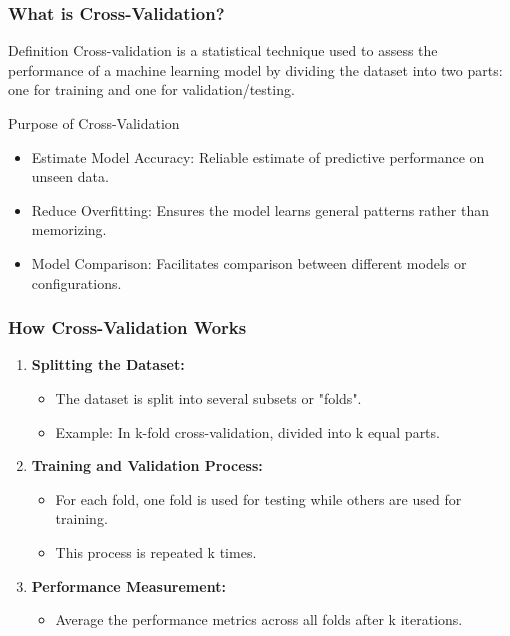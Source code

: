 \documentclass[aspectratio=169]{beamer}
\begin{document}
\begin{frame}[fragile]
    \frametitle{What is Cross-Validation?}
    \begin{block}{Definition}
        Cross-validation is a statistical technique used to assess the performance of a machine learning model by dividing the dataset into two parts: one for training and one for validation/testing.
    \end{block}
    
    \begin{block}{Purpose of Cross-Validation}
        \begin{itemize}
            \item Estimate Model Accuracy: Reliable estimate of predictive performance on unseen data.
            \item Reduce Overfitting: Ensures the model learns general patterns rather than memorizing.
            \item Model Comparison: Facilitates comparison between different models or configurations.
        \end{itemize}
    \end{block}
\end{frame}

\begin{frame}[fragile]
    \frametitle{How Cross-Validation Works}
    \begin{enumerate}
        \item \textbf{Splitting the Dataset:}
        \begin{itemize}
            \item The dataset is split into several subsets or "folds". 
            \item Example: In k-fold cross-validation, divided into k equal parts.
        \end{itemize}
        
        \item \textbf{Training and Validation Process:}
        \begin{itemize}
            \item For each fold, one fold is used for testing while others are used for training.
            \item This process is repeated k times.
        \end{itemize}
        
        \item \textbf{Performance Measurement:}
        \begin{itemize}
            \item Average the performance metrics across all folds after k iterations.
        \end{itemize}
    \end{enumerate}
\end{frame}
\end{document}
